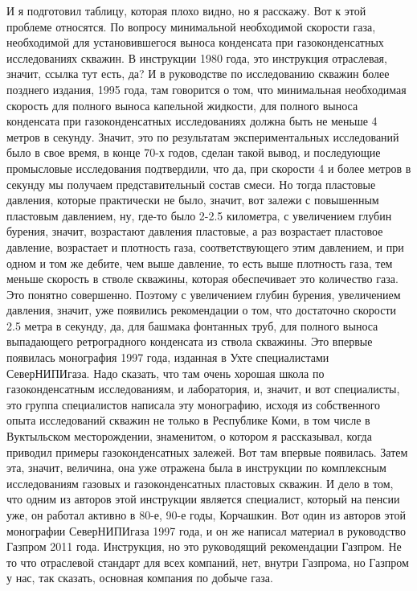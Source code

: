 \documentclass[main.tex]{subfiles}
\begin{document}
И я подготовил таблицу, которая плохо видно, но я расскажу.
Вот к этой проблеме относятся.
По вопросу минимальной необходимой скорости газа, необходимой для установившегося выноса конденсата при газоконденсатных исследованиях скважин.
В инструкции 1980 года, это инструкция отраслевая, значит, ссылка тут есть, да?
И в руководстве по исследованию скважин более позднего издания, 1995 года, там говорится о том, что минимальная необходимая скорость для полного выноса капельной жидкости, для полного выноса конденсата при газоконденсатных исследованиях должна быть не меньше 4 метров в секунду.
Значит, это по результатам экспериментальных исследований было в свое время, в конце 70-х годов, сделан такой вывод, и последующие промысловые исследования подтвердили, что да, при скорости 4 и более метров в секунду мы получаем представительный состав смеси.
Но тогда пластовые давления, которые практически не было, значит, вот залежи с повышенным пластовым давлением, ну, где-то было 2-2.5 километра, с увеличением глубин бурения, значит, возрастают давления пластовые, а раз возрастает пластовое давление, возрастает и плотность газа, соответствующего этим давлением, и при одном и том же дебите, чем выше давление, то есть выше плотность газа, тем меньше скорость в стволе скважины, которая обеспечивает это количество газа.
Это понятно совершенно.
Поэтому с увеличением глубин бурения, увеличением давления, значит, уже появились рекомендации о том, что достаточно скорости 2.5 метра в секунду, да, для башмака фонтанных труб, для полного выноса выпадающего ретроградного конденсата из ствола скважины.
Это впервые появилась монография 1997 года, изданная в Ухте специалистами СеверНИПИгаза.
Надо сказать, что там очень хорошая школа по газоконденсатным исследованиям, и лаборатория, и, значит, и вот специалисты, это группа специалистов написала эту монографию, исходя из собственного опыта исследований скважин не только в Республике Коми, в том числе в Вуктыльском месторождении, знаменитом, о котором я рассказывал, когда приводил примеры газоконденсатных залежей.
Вот там впервые появилась.
Затем эта, значит, величина, она уже отражена была в инструкции по комплексным исследованиям газовых и газоконденсатных пластовых скважин.
И дело в том, что одним из авторов этой инструкции является специалист, который на пенсии уже, он работал активно в 80-е, 90-е годы, Корчашкин.
Вот один из авторов этой монографии СеверНИПИгаза 1997 года, и он же написал материал в руководство Газпром 2011 года.
Инструкция, но это руководящий рекомендации Газпром.
Не то что отраслевой стандарт для всех компаний, нет, внутри Газпрома, но Газпром у нас, так сказать, основная компания по добыче газа.
\end{document}
